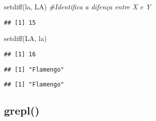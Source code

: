\documentclass[
]{book}
\newenvironment{Shaded}{\begin{snugshade}}{\end{snugshade}}
\newcommand{\AttributeTok}[1]{\textcolor[rgb]{0.77,0.63,0.00}{#1}}
\newcommand{\CommentTok}[1]{\textcolor[rgb]{0.56,0.35,0.01}{\textit{#1}}}
\newcommand{\ConstantTok}[1]{\textcolor[rgb]{0.00,0.00,0.00}{#1}}
\newcommand{\DecValTok}[1]{\textcolor[rgb]{0.00,0.00,0.81}{#1}}
\newcommand{\FloatTok}[1]{\textcolor[rgb]{0.00,0.00,0.81}{#1}}
\newcommand{\FunctionTok}[1]{\textcolor[rgb]{0.00,0.00,0.00}{#1}}
\newcommand{\NormalTok}[1]{#1}
\newcommand{\SpecialCharTok}[1]{\textcolor[rgb]{0.00,0.00,0.00}{#1}}
\newcommand{\StringTok}[1]{\textcolor[rgb]{0.31,0.60,0.02}{#1}}
\begin{document}
\begin{Shaded}
\begin{Highlighting}[]
\FunctionTok{setdiff}\NormalTok{(la, LA) }\CommentTok{\#Identifica a difença entre X e Y}
\end{Highlighting}
\end{Shaded}

\begin{verbatim}
## [1] 15
\end{verbatim}

\begin{Shaded}
\begin{Highlighting}[]
\FunctionTok{setdiff}\NormalTok{(LA, la) }
\end{Highlighting}
\end{Shaded}

\begin{verbatim}
## [1] 16
\end{verbatim}

\begin{Shaded}
\end{Shaded}

\begin{verbatim}
## [1] "Flamengo"
\end{verbatim}

\begin{Shaded}
\end{Shaded}

\begin{verbatim}
## [1] "Flamengo"
\end{verbatim}

\hypertarget{grepl}{%
\subsection{grepl()}\label{grepl}}

\begin{Shaded}
\end{Shaded}
\end{document}
